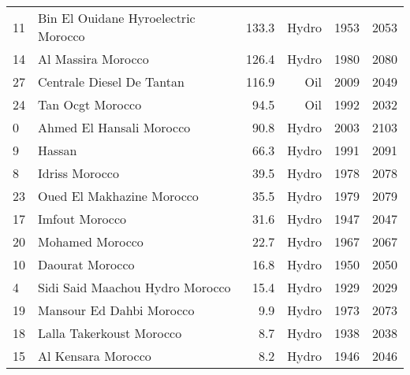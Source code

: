 \begin{table}
\begin{tabular}{p{1cm}p{6.5cm}rrp{2cm}p{3.4cm}}
11 &          Bin El Ouidane Hyroelectric Morocco &           133.3 &      Hydro &        1953 &          2053 \\
14 &                           Al Massira Morocco &           126.4 &      Hydro &        1980 &          2080 \\
27 &                    Centrale Diesel De Tantan &           116.9 &        Oil &        2009 &          2049 \\
24 &                             Tan Ocgt Morocco &            94.5 &        Oil &        1992 &          2032 \\
0  &                     Ahmed El Hansali Morocco &            90.8 &      Hydro &        2003 &          2103 \\
9  &                                       Hassan &            66.3 &      Hydro &        1991 &          2091 \\
8  &                               Idriss Morocco &            39.5 &      Hydro &        1978 &          2078 \\
23 &                    Oued El Makhazine Morocco &            35.5 &      Hydro &        1979 &          2079 \\
17 &                               Imfout Morocco &            31.6 &      Hydro &        1947 &          2047 \\
20 &                              Mohamed Morocco &            22.7 &      Hydro &        1967 &          2067 \\
10 &                              Daourat Morocco &            16.8 &      Hydro &        1950 &          2050 \\
4  &              Sidi Said Maachou Hydro Morocco &            15.4 &      Hydro &        1929 &          2029 \\
19 &                     Mansour Ed Dahbi Morocco &             9.9 &      Hydro &        1973 &          2073 \\
18 &                     Lalla Takerkoust Morocco &             8.7 &      Hydro &        1938 &          2038 \\
15 &                           Al Kensara Morocco &             8.2 &      Hydro &        1946 &          2046 \\
\bottomrule
\end{tabular}
\end{table}
